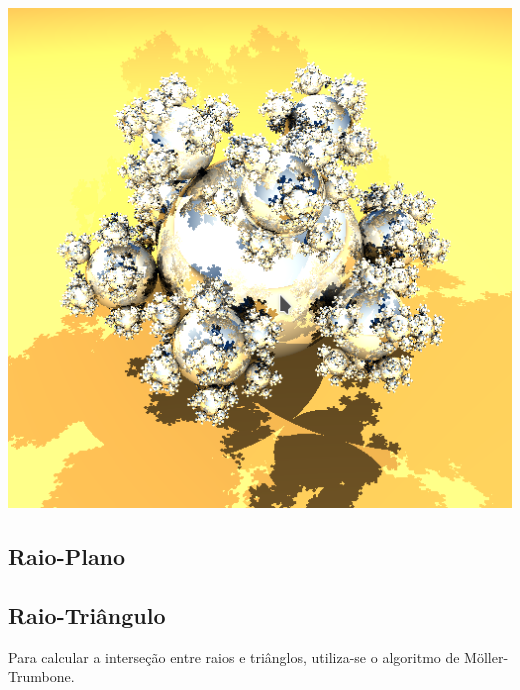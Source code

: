 \documentclass{article}
\begin{document}
        \includegraphics[scale=0.27]{deez_high} 

    \subsection*{Raio-Plano}

    \subsection*{Raio-Triângulo}

        \par
        Para calcular a interseção entre raios e triânglos, utiliza-se o algoritmo de Möller-Trumbone.
\end{document}
